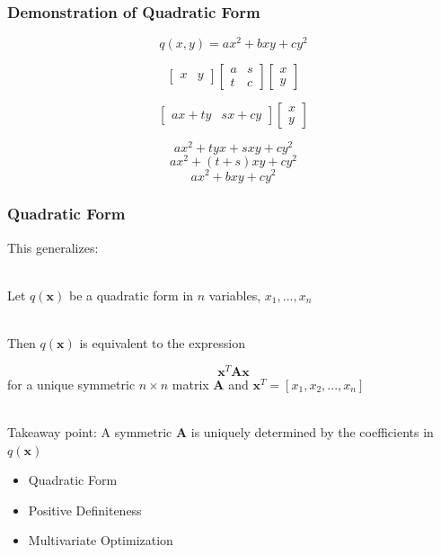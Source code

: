 \documentclass[handout]{beamer}
\numberwithin{equation}{section}
\begin{document}
\begin{frame}
\frametitle{Demonstration of Quadratic Form}
$$q(x, y)=ax^2+bxy+cy^2$$ \pause

$$\begin{bmatrix}
x& y
\end{bmatrix} 
\begin{bmatrix}
a & s \\
t& c
\end{bmatrix} 
\begin{bmatrix}
x\\
 y
\end{bmatrix} 
$$\pause

$$\begin{bmatrix}
ax+ty& sx+cy
\end{bmatrix} 
\begin{bmatrix}
x\\
 y
\end{bmatrix} 
$$\pause

$$
ax^2+tyx+ sxy+cy^2
$$\pause
$$
ax^2+(t+s)xy+cy^2
$$\pause
$$
ax^2+bxy+cy^2
$$


\end{frame}




\begin{frame}
\frametitle{Quadratic Form}

This generalizes: \pause

\ \\Let $q(\mathbf{x})$ be a quadratic form in $n$ variables, $x_1, ..., x_n$ \pause

\ \\Then $q(\mathbf{x})$ is equivalent to the expression

$$\mathbf{x}^T\mathbf{A}\mathbf{x}$$ for a unique symmetric $n\times n$ matrix $\mathbf{A}$ and $\mathbf{x}^T=[x_1, x_2, ..., x_n]$ \pause

\ \\Takeaway point: A symmetric $\mathbf{A}$ is uniquely determined by the coefficients in  $q(\mathbf{x})$

\end{frame}



\begin{frame}

\begin{itemize}
\item \textcolor{mygray}{Quadratic Form}
\item \textcolor{myblack}{Positive Definiteness}
\item \textcolor{mygray}{Multivariate Optimization}
\end{itemize}

\end{frame}
\end{document}
